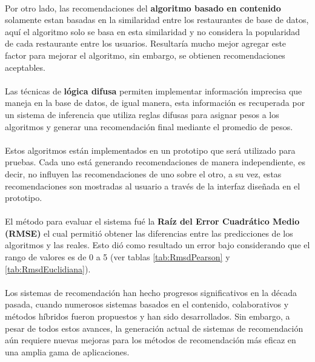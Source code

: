 \documentclass[12pt,letterpaper,oneside] {memoir}
\begin{document}
\paragraph{}
Por otro lado, las recomendaciones del \textbf{algoritmo basado en contenido} solamente estan basadas en la similaridad entre los restaurantes de base de datos,  aquí el algoritmo solo se basa en esta similaridad y no considera  la popularidad de cada restaurante entre los usuarios. Resultaría mucho mejor agregar este factor para mejorar el algoritmo, sin embargo, se obtienen recomendaciones aceptables.\\
\paragraph{}
Las técnicas de \textbf{lógica difusa} permiten implementar información imprecisa que maneja en la base de datos, de igual manera, esta información es recuperada por un sistema de inferencia que utiliza reglas difusas para asignar pesos a los algoritmos y generar una recomendación final mediante el promedio de pesos.
\paragraph*{}
Estos algoritmos están implementados en un prototipo que será utilizado para pruebas. Cada uno está generando recomendaciones de manera independiente, es decir, no influyen las recomendaciones de uno sobre el otro,  a su vez,  estas recomendaciones son mostradas al usuario a través de la interfaz diseñada en el prototipo.
\paragraph*{}
El método para evaluar el sistema fué la \textbf{Raíz del Error Cuadrático Medio (RMSE)} el cual permitió obtener las diferencias entre las predicciones de los algoritmos y las reales. Esto dió como resultado un error bajo considerando que el rango de valores es de 0 a 5 (ver tablas \ref{tab:RmsdPearson} y \ref{tab:RmsdEuclidiana}).
\paragraph{}
Los sistemas de recomendación han hecho progresos significativos en la década pasada, cuando numerosos sistemas  basados en el contenido, colaborativos y  métodos híbridos fueron propuestos y  han sido desarrollados. Sin embargo, a pesar de todos estos avances, la generación actual de sistemas de recomendación aún requiere nuevas mejoras para los métodos de recomendación más eficaz en una amplia gama de aplicaciones. 
\end{document}
